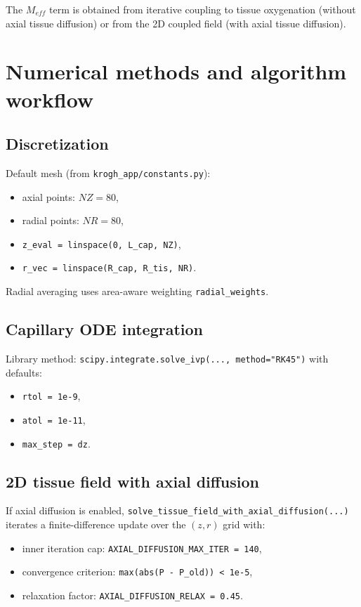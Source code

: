 \documentclass[12pt,a4paper]{article}
\begin{document}
The $M_{eff}$ term is obtained from iterative coupling to tissue oxygenation (without axial tissue diffusion) or from the 2D coupled field (with axial tissue diffusion).

\section{Numerical methods and algorithm workflow}
\subsection{Discretization}
Default mesh (from \texttt{krogh\_app/constants.py}):
\begin{itemize}
    \item axial points: $NZ=80$,
    \item radial points: $NR=80$,
    \item \texttt{z\_eval = linspace(0, L\_cap, NZ)},
    \item \texttt{r\_vec = linspace(R\_cap, R\_tis, NR)}.
\end{itemize}
Radial averaging uses area-aware weighting \texttt{radial\_weights}.

\subsection{Capillary ODE integration}
Library method: \texttt{scipy.integrate.solve\_ivp(..., method="RK45")}
with defaults:
\begin{itemize}
    \item \texttt{rtol = 1e-9},
    \item \texttt{atol = 1e-11},
    \item \texttt{max\_step = dz}.
\end{itemize}

\subsection{2D tissue field with axial diffusion}
If axial diffusion is enabled, \texttt{solve\_tissue\_field\_with\_axial\_diffusion(...)} iterates a finite-difference update over the $(z,r)$ grid with:
\begin{itemize}
    \item inner iteration cap: \texttt{AXIAL\_DIFFUSION\_MAX\_ITER = 140},
    \item convergence criterion: \texttt{max(abs(P - P\_old)) < 1e-5},
    \item relaxation factor: \texttt{AXIAL\_DIFFUSION\_RELAX = 0.45}.
\end{itemize}
\end{document}
